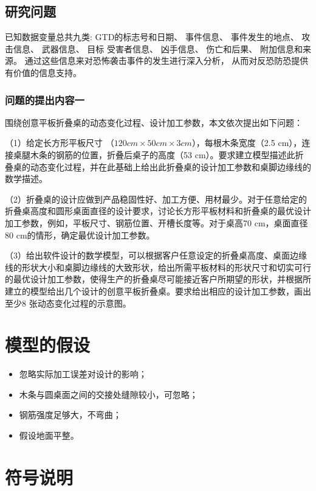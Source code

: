\documentclass[bwprint]{gmcmthesis}
\begin{document}
\subsection{研究问题}

已知数据变量总共九类:
GTD的标志号和日期、
事件信息、
事件发生的地点、
攻击信息、
武器信息、
目标\/ 受害者信息、
凶手信息、
伤亡和后果、
附加信息和来源。
通过这些信息来对恐怖袭击事件的发生进行深入分析，
从而对反恐防恐提供有价值的信息支持。

\subsubsection{问题的提出内容一}

围绕创意平板折叠桌的动态变化过程、设计加工参数，本文依次提出如下问题：

（1）给定长方形平板尺寸 （$120 cm \times 50 cm \times 3 cm$），每根木条宽度（2.5 cm），连接桌腿木条的钢筋的位置，折叠后桌子的高度（53 cm）。要求建立模型描述此折叠桌的动态变化过程，并在此基础上给出此折叠桌的设计加工参数和桌脚边缘线的数学描述。



（2）折叠桌的设计应做到产品稳固性好、加工方便、用材最少。对于任意给定的折叠桌高度和圆形桌面直径的设计要求，讨论长方形平板材料和折叠桌的最优设计加工参数，例如，平板尺寸、钢筋位置、开槽长度等。对于桌高70 cm，桌面直径80 cm的情形，确定最优设计加工参数。


（3）给出软件设计的数学模型，可以根据客户任意设定的折叠桌高度、桌面边缘线的形状大小和桌脚边缘线的大致形状，给出所需平板材料的形状尺寸和切实可行的最优设计加工参数，使得生产的折叠桌尽可能接近客户所期望的形状，并根据所建立的模型给出几个设计的创意平板折叠桌。要求给出相应的设计加工参数，画出至少8 张动态变化过程的示意图。

\section{模型的假设}

\begin{itemize}
\item 忽略实际加工误差对设计的影响；
\item 木条与圆桌面之间的交接处缝隙较小，可忽略；
\item 钢筋强度足够大，不弯曲；
\item 假设地面平整。
\end{itemize}

\section{符号说明}
\end{document}
